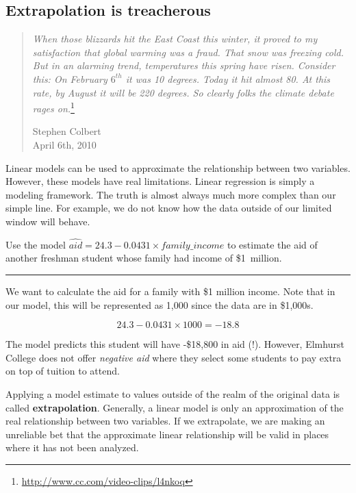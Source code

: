 \documentclass[
  10pt,
  openany]{book}
\theoremstyle{definition}
\theoremstyle{definition}
\theoremstyle{definition}
\theoremstyle{definition}
\theoremstyle{remark}
\begin{document}
\subsection{Extrapolation is treacherous}\label{extrapolation-is-treacherous}

\begin{quote}
\emph{When those blizzards hit the East Coast this winter, it proved to my satisfaction that global warming was a fraud. That snow was freezing cold. But in an alarming trend, temperatures this spring have risen. Consider this: On February \(6^{th}\) it was 10 degrees. Today it hit almost 80. At this rate, by August it will be 220 degrees. So clearly folks the climate debate rages on.}\footnote{\url{http://www.cc.com/video-clips/l4nkoq}}

Stephen Colbert\\
April 6th, 2010
\end{quote}

Linear models can be used to approximate the relationship between two variables. However, these models have real limitations.
Linear regression is simply a modeling framework.
The truth is almost always much more complex than our simple line.
For example, we do not know how the data outside of our limited window will behave.

Use the model \(\widehat{aid} = 24.3 - 0.0431 \times \textit{family_income}\) to estimate the aid of another freshman student whose family had income of \$1~million.

\begin{center}\rule{0.5\linewidth}{0.5pt}\end{center}

We want to calculate the aid for a family with \$1 million income.
Note that in our model, this will be represented as 1,000 since the data are in \$1,000s.

\[24.3 - 0.0431 \times 1000 = -18.8 \]

The model predicts this student will have -\$18,800 in aid (!).
However, Elmhurst College does not offer \emph{negative aid} where they select some students to pay extra on top of tuition to attend.

Applying a model estimate to values outside of the realm of the original data is called \textbf{extrapolation}.
Generally, a linear model is only an approximation of the real relationship between two variables.
If we extrapolate, we are making an unreliable bet that the approximate linear relationship will be valid in places where it has not been analyzed.
\end{document}
